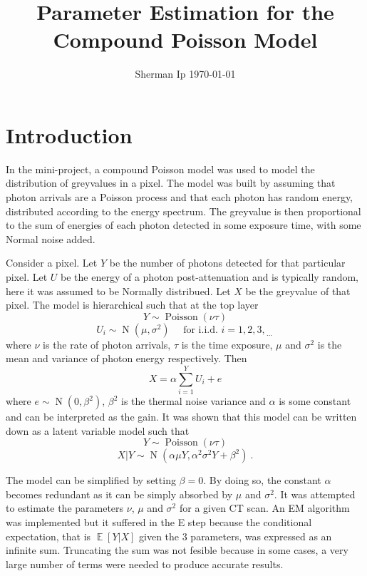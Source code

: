\documentclass[a4paper]{proc}
\title{Parameter Estimation for the Compound Poisson Model}
\author{Sherman Ip \quad \today}
\DeclareMathOperator{\expectation}{\mathbb{E}}
\DeclareMathOperator{\normal}{N}
\DeclareMathOperator{\poisson}{Poisson}
\newcommand{\dotdotdot}{_{\phantom{.}\cdots}}
\begin{document}
\maketitle

\section{Introduction}
In the mini-project, a compound Poisson model was used to model the distribution of greyvalues in a pixel. The model was built by assuming that photon arrivals are a Poisson process and that each photon has random energy, distributed according to the energy spectrum. The greyvalue is then proportional to the sum of energies of each photon detected in some exposure time, with some Normal noise added.

Consider a pixel. Let $Y$ be the number of photons detected for that particular pixel. Let $U$ be the energy of a photon post-attenuation and is typically random, here it was assumed to be Normally distribued. Let $X$ be the greyvalue of that pixel. The model is hierarchical such that at the top layer
\begin{equation}
Y\sim\poisson\left(\nu\tau\right)
\end{equation}
\begin{equation}
U_i\sim\normal\left(\mu,\sigma^2\right) \quad \text{ for i.i.d. }i=1,2,3,\dotdotdot
\end{equation}
where $\nu$ is the rate of photon arrivals, $\tau$ is the time exposure, $\mu$ and $\sigma^2$ is the mean and variance of photon energy respectively. Then
\begin{equation}
X = \alpha\sum_{i=1}^Y U_i + e
\end{equation}
where $e\sim\normal(0,\beta^2)$, $\beta^2$ is the thermal noise variance and $\alpha$ is some constant and can be interpreted as the gain. It was shown that this model can be written down as a latent variable model such that 
\begin{equation}
Y\sim\poisson\left(\nu\tau\right)
\end{equation}
\begin{equation}
X|Y\sim\normal\left(\alpha\mu Y, \alpha^2\sigma^2 Y + \beta^2\right) \ .
\end{equation}

The model can be simplified by setting $\beta=0$. By doing so, the constant $\alpha$ becomes redundant as it can be simply absorbed by $\mu$ and $\sigma^2$. It was attempted to estimate the parameters $\nu$, $\mu$ and $\sigma^2$ for a given CT scan. An EM algorithm \cite{dempster1977maximum} was implemented but it suffered in the E step because the conditional expectation, that is $\expectation\left[Y|X\right]$ given the 3 parameters, was expressed as an infinite sum. Truncating the sum was not fesible because in some cases, a very large number of terms were needed to produce accurate results.
\end{document}
